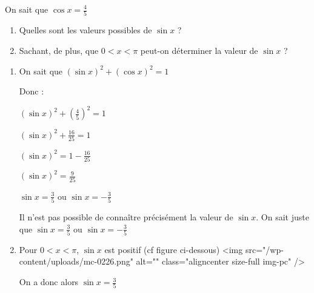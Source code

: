 
%
On sait que $\cos x = \frac{4}{5}$
\begin{enumerate}
     \item
     Quelles sont les valeurs possibles de $\sin x$ ?
     \item
     Sachant, de plus, que $0 < x < \pi $ peut-on déterminer la valeur de $\sin x$ ?
\end{enumerate}
\begin{corrige}
     \begin{enumerate}
          \item
          On sait que $\left(\sin x\right)^{2}+\left(\cos x\right)^{2}=1$
          \par
          Donc :
          \par
          $\left(\sin x\right)^{2}+\left(\frac{4}{5}\right)^{2}=1$
          \par
          $\left(\sin x\right)^{2}+\frac{16}{25}=1$
          \par
          $\left(\sin x\right)^{2}=1-\frac{16}{25}$
          \par
          $\left(\sin x\right)^{2}=\frac{9}{25}$
          \par
          $\sin x=\frac{3}{5}$ ou $\sin x=-\frac{3}{5}$
          \par
          Il n'est pas possible de connaître précisément la valeur de $\sin x$. On sait juste que $\sin x=\frac{3}{5}$ ou $\sin x=-\frac{3}{5}$
          \item
          Pour  $0 < x < \pi$, $\sin x$ est positif (cf figure ci-dessous)
          <img src="/wp-content/uploads/mc-0226.png" alt="" class="aligncenter size-full  img-pc" />

\begin{center}
\end{center}
          On a donc alors $\sin x=\frac{3}{5}$
     \end{enumerate}
\end{corrige}
